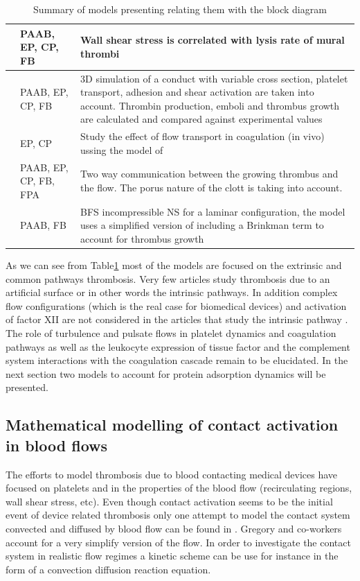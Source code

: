 \documentclass[%
 nofootinbib,
 amsmath,amssymb,
 aps,
 pra,
]{revtex4-1}
\begin{document}
\begin{table}[h]
\begin{tabular}{|p{5 cm} | p{3.5cm} | p{9.5 cm} |}
\hline
\citet{Wootton:2002} &  PAAB, EP, CP, FB & Wall shear stress is correlated with lysis rate of mural thrombi\\
\hline
\citet{Goodman:2005} & PAAB, EP, CP, FB & 3D simulation of a conduct with variable cross section, platelet transport, adhesion and shear activation are taken into account. Thrombin production, emboli and thrombus growth are calculated and compared against experimental values\\
\hline
\citet{Biasetti:2012} & EP, CP  & Study the effect of flow transport in coagulation (in vivo) ussing the model of \cite{Jones:1994}\\
\hline
\citet{Leiderman:2011} & PAAB, EP, CP, FB, FPA & Two way communication between the growing thrombus and the flow. The porus nature of the clott is taking into account.\\
\hline
\citet{Taylor:2015} & PAAB, FB & BFS incompressible NS for a laminar configuration, the model uses a simplified version of \citet{Fogelson:2004} including a Brinkman term to account for thrombus growth \\
\hline
\end{tabular}\caption{\label{tab:recap}Summary of models presenting relating them with the block diagram}
\end{table}

As we can see from Table\ref{tab:recap} most of the models are focused on the extrinsic and common pathways thrombosis. Very few articles study thrombosis due to an artificial surface or in other words the intrinsic pathways. In addition complex flow configurations (which is the real case for biomedical devices) and activation of factor XII are not considered in the articles that study the intrinsic pathway \citep{Gregory:1994,Zarnitsina:1996,Mandrusov:1998,Chatterjee:2010,Kogan:2001}.\\ The role of turbulence and pulsate flows in platelet dynamics and coagulation pathways as well as the leukocyte expression of tissue factor and the complement system interactions with the coagulation cascade remain to be elucidated. In the next section two models to account for protein adsorption dynamics will be presented.
\subsection{Mathematical modelling of contact activation in blood flows}
The efforts to model thrombosis due to blood contacting medical devices have focused on platelets and in the properties of the blood flow (recirculating regions, wall shear stress, etc). Even though contact activation seems to be the initial event of device related thrombosis only one attempt to model the contact system convected and diffused by blood flow can be found in \citep{Gregory:1994}. Gregory and co-workers account for a very simplify version of the flow. In order to investigate the contact system in realistic flow regimes a kinetic scheme can be use for instance in the form of a convection diffusion reaction equation.\\
\end{document}
